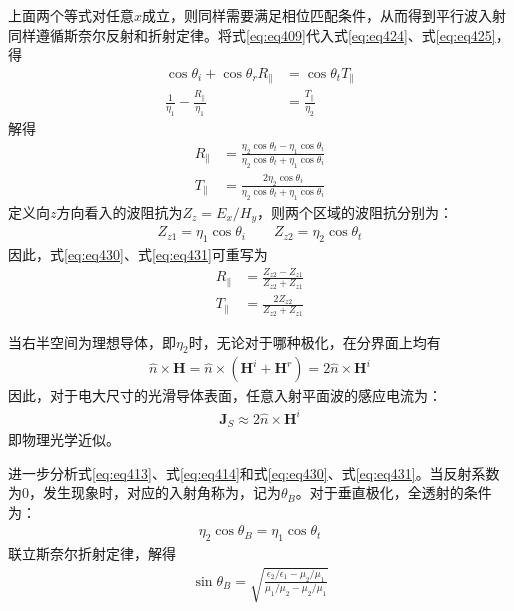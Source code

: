 \documentclass{article}
\numberwithin{equation}{section}
\begin{document}
上面两个等式对任意$x$成立，则同样需要满足相位匹配条件，从而得到平行波入射同样遵循斯奈尔反射和折射定律。将式\ref{eq:eq409}代入式\ref{eq:eq424}、式\ref{eq:eq425}，得
\begin{align}
    \label{eq:eq428}
    \cos\theta_i+\cos\theta_rR_{\parallel}&=\cos\theta_tT_{\parallel} \\
    \label{eq:eq429}
    \frac{1}{\eta_1}-\frac{R_{\parallel}}{\eta_1}&=\frac{T_{\parallel}}{\eta_2}
\end{align}
解得
\begin{align}
    \label{eq:eq430}
    R_{\parallel}&=\frac{\eta_2\cos\theta_t-\eta_1\cos\theta_i}{\eta_2\cos\theta_t+\eta_1\cos\theta_i} \\
    \label{eq:eq431}
    T_{\parallel}&=\frac{2\eta_2\cos\theta_i}{\eta_2\cos\theta_t+\eta_1\cos\theta_i}
\end{align}
定义向$z$方向看入的波阻抗为$Z_z=E_x/H_y$，则两个区域的波阻抗分别为：
\begin{align}
    \label{eq:eq432}
    Z_{z1}=\eta_1{\cos\theta_i}\qquad Z_{z2}=\eta_2{\cos\theta_t}
\end{align}
因此，式\ref{eq:eq430}、式\ref{eq:eq431}可重写为
\begin{align}
    \label{eq:eq433}
    R_{\parallel}&=\frac{Z_{z2}-Z_{z1}}{Z_{z2}+Z_{z1}} \\
    \label{eq:eq434}
    T_{\parallel}&=\frac{2Z_{z2}}{Z_{z2}+Z_{z1}}
\end{align}
\par
当右半空间为理想导体，即$\eta_2$时，无论对于哪种极化，在分界面上均有
\begin{align}
    \label{eq:eq435}
    \hat{n}\times\mathbf{H}=\hat{n}\times(\mathbf{H}^i+\mathbf{H}^r)=2\hat{n}\times\mathbf{H}^i
\end{align}
因此，对于电大尺寸的光滑导体表面，任意入射平面波的感应电流为：
\begin{align}
    \label{eq:eq436}
    \mathbf{J}_S\approx2\hat{n}\times\mathbf{H}^i
\end{align}
即物理光学近似。\par
进一步分析式\ref{eq:eq413}、式\ref{eq:eq414}和式\ref{eq:eq430}、式\ref{eq:eq431}。当反射系数为0，发生\textbf{\color{blue}{全透射}}现象时，对应的入射角称为\textbf{\color{blue}{布儒斯特角}}，记为$\theta_B$。对于垂直极化，全透射的条件为：
\begin{align}
    \label{eq:eq437}
    \eta_2\cos\theta_B=\eta_1\cos\theta_t
\end{align}
联立斯奈尔折射定律，解得
\begin{align}
    \label{eq:eq438}
    \sin\theta_B=\sqrt{\frac{\epsilon_2/\epsilon_1-\mu_2/\mu_1}{\mu_1/\mu_2-\mu_2/\mu_1}}
\end{align}
\end{document}

